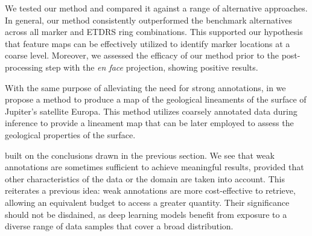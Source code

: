 We tested our method and compared it against a range of alternative approaches. In general, our method consistently outperformed the benchmark alternatives across all marker and ETDRS ring combinations. This supported our hypothesis that feature maps can be effectively utilized to identify marker locations at a coarse level. Moreover, we assessed the efficacy of our method prior to the post-processing step with the \textit{en face} projection, showing positive results.

With the same purpose of alleviating the need for strong annotations, in  we propose a method to produce a map of the geological lineaments of the surface of Jupiter's satellite Europa. This method utilizes coarsely annotated data during inference to provide a lineament map that can be later employed to assess the geological properties of the surface. 

 built on the conclusions drawn in the previous section. We see that weak annotations are sometimes sufficient to achieve meaningful results, provided that other characteristics of the data or the domain are taken into account. This reiterates a previous idea: weak annotations are more cost-effective to retrieve, allowing an equivalent budget to access a greater quantity. Their significance should not be disdained, as deep learning models benefit from exposure to a diverse range of data samples that cover a broad distribution.